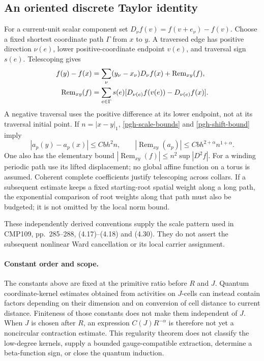 \documentclass[11pt]{article}
\theoremstyle{remark}
\begin{document}
\subsection{An oriented discrete Taylor identity}
\label{pgh-taylor-section}

For a current-unit scalar component set
$D_\nu f(v)=f(v+e_\nu)-f(v)$. Choose a fixed shortest coordinate
path $\Gamma$ from $x$ to $y$. A traversed edge has positive
direction $\nu(e)$, lower positive-coordinate endpoint $v(e)$,
and traversal sign $s(e)$. Telescoping gives
\begin{align}
 f(y)-f(x)&=\sum_\nu(y_\nu-x_\nu)D_\nu f(x)
                         +\operatorname{Rem}_{xy}(f),\notag\\
 \operatorname{Rem}_{xy}(f)
 &=\sum_{e\in\Gamma}s(e)
       [D_{\nu(e)}f(v(e))-D_{\nu(e)}f(x)].
 \label{pgh-taylor}
\end{align}
A negative traversal uses the positive difference at its lower
endpoint, not at its traversal initial point. If $n=|x-y|_1$,
\eqref{pgh-scale-bounds} and \eqref{pgh-shift-bound} imply
\begin{equation}
 |a_p(y)-a_p(x)|\le Cbh^2n,\qquad
 |\operatorname{Rem}_{xy}(a_p)|
                      \le Cbh^{2+\alpha}n^{1+\alpha}.
 \label{pgh-taylor-bound}
\end{equation}
One also has the elementary bound
$|\operatorname{Rem}_{xy}(f)|\le n^2\sup|D^2f|$.
For a winding periodic path use its lifted displacement;
no global affine function on a torus is assumed. Coherent complete
coefficients justify telescoping across collars. If a subsequent
estimate keeps a fixed starting-root spatial weight along a long
path, the exponential comparison of root weights along that path
must also be budgeted; it is not omitted by the local norm bound.

These independently derived conventions supply the scale
pattern used in CMP109, pp.~285--288,
(4.17)--(4.18) and (4.30). They do not assert the subsequent
nonlinear Ward cancellation or its local carrier assignment.

\paragraph{Constant order and scope.}
The constants above are fixed at the primitive ratio before
$R$ and $J$. Quantum coordinate-kernel estimates obtained from
activities on $J$-cells can instead contain factors depending
on their dimension and on conversion of cell distance to
current distance. Finiteness of those constants does not make
them independent of $J$. When $J$ is chosen after $R$, an
expression $C(J)R^{-\alpha}$ is therefore not yet a
noncircular contraction estimate. This regularity theorem
does not classify the low-degree kernels, supply a bounded
gauge-compatible extraction, determine a beta-function sign,
or close the quantum induction.
\end{document}
